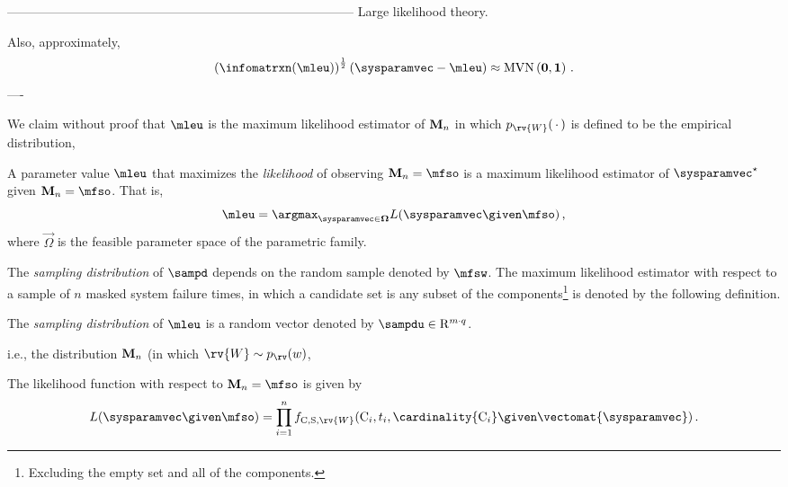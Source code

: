 \documentclass[../main.tex]{subfiles}
\begin{document}
-----------------------------------------------------------------------------------
Large likelihood theory.


Also, approximately, 
\begin{equation}
    \left(\infomatrxn(\mleu)\right)^{\frac{1}{2}}\left(\sysparamvec - \mleu\right) \approx \mvn\left(\vec{0}, \vec{1}\right)\,.
\end{equation}
----























We claim without proof that $\mleu$ is the maximum likelihood estimator of $\mathbf{M}_n$ in which $\pmf_{\rv{W}}(\,\cdot\,)$ is defined to be the empirical distribution,


\begin{definition}
\label{def:general_mleu}
A parameter value $\mleu$ that maximizes the \emph{likelihood} of observing $\mfs = \mfso$ is a maximum likelihood estimator of $\tparam\sysparamvec$ given $\mfs = \mfso$. That is,
\begin{equation}
\label{eq:general_mleu}
\mleu = \argmax_{\sysparamvec \in \vec\Omega} L(\sysparamvec \given \mfso)\,,
\end{equation}
where $\vec\Omega$ is the feasible parameter space of the parametric family.
\end{definition}

The \emph{sampling distribution} of $\sampd$ depends on the random sample denoted by $\mfsw$. The maximum likelihood estimator with respect to a sample of $n$ masked system failure times, in which a candidate set is any subset of the components\footnote{Excluding the empty set and all of the components.} is denoted by the following definition.
\begin{definition}
The \emph{sampling distribution} of $\mleu$ is a random vector denoted by $\sampdu \in \mathrm{R}^{m \cdot q}$.
\end{definition}
i.e., the distribution $\mathbf{M}_n$ (in which $\rv{W} \sim \pmf_{\rv}(w)$,


The likelihood function with respect to $\mfs = \mfso$ is given by
\begin{equation}
    L(\sysparamvec \given \mfso) = \prod_{i=1}^{n} \pdf_{\rvcand, \sv, \rv{W}}(\cand_i, t_i, \cardinality{\cand_i} \given \vectomat{\sysparamvec})\,.
\end{equation}
\end{document}
